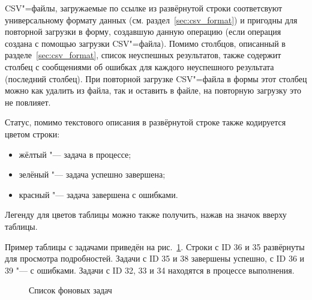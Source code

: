 CSV"=файлы, загружаемые по ссылке из развёрнутой строки соответсвуют универсальному формату данных (см. раздел~\ref{sec:csv_format}) и пригодны для повторной загрузки в форму, создавшую данную операцию (если операция создана с помощью загрузки CSV"=файла). Помимо столбцов, описанный в разделе~\ref{sec:csv_format}, список неуспешных результатов, также содержит столбец с сообщениями об ошибках для каждого неуспешного результата (последний столбец). При повторной загрузке CSV"=файла в формы этот столбец можно как удалить из файла, так и оставить в файле, на повторную загрузку это не повлияет.

Статус, помимо текстового описания в развёрнутой строке также кодируется цветом строки:
\begin{itemize}
	\item жёлтый "--- задача в процессе;
	\item зелёный "--- задача успешно завершена;
	\item красный "--- задача завершена с ошибками.
\end{itemize}

Легенду для цветов таблицы можно также получить, нажав на значок  вверху таблицы.

Пример таблицы с задачами приведён на рис.~\ref{img:mat:list}. Строки с ID 36 и 35 развёрнуты для просмотра подробностей. Задачи с ID 35 и 38 завершены успешно, с ID 36 и 39 "--- с ошибками. Задачи с ID 32, 33 и 34 находятся в процессе выполнения.

\begin{figure}[H]
	\caption{Список фоновых задач}
	\label{img:mat:list}
\end{figure}
